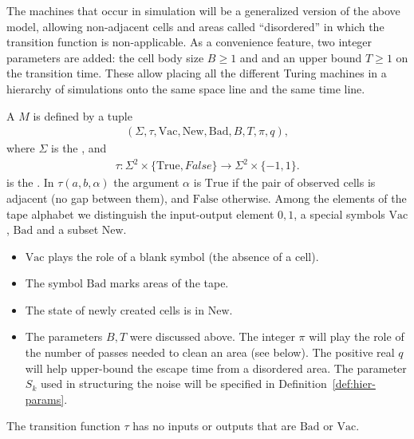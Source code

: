 \documentclass[11pt]{memoir}
\theoremstyle{definition} %
\renewcommand{\ge}{\geq}
\def\B{B}
\newcommand{\escno}{q}
\newcommand{\passno}{\pi}
\renewcommand{\S}{S} %
\newcommand{\Tu}{T}
\newcommand{\Bad}{\mathrm{Bad}}
\newcommand{\Vacant}{\mathrm{Vac}}
\newcommand{\New}{\mathrm{New}}
\newcommand{\True}{\mathrm{True}}
\newcommand{\False}{\mathrm{False}}
\begin{document}
The machines that occur in simulation will be a generalized version of the above model,
allowing non-adjacent cells and areas called ``disordered''
in which the transition function is non-applicable.
As a convenience feature, two integer parameters are added:
the cell body size \( \B\ge 1 \) and and an upper bound \( \Tu\ge 1 \) on the transition time.
These allow placing all the different Turing
machines in a hierarchy of simulations onto the same space line and the same time line.

\begin{definition}\label{def:gen-TM}
  A  \( M \) is defined by a tuple
  \begin{align}\label{eq:gen-TM}
    (\Sigma, \tau, \Vacant, \New, \Bad,\B, \Tu, \passno, \escno),
  \end{align}
  where \( \Sigma \) is the , and
\begin{align*}
  \tau: \Sigma^{2}\times\{\True,False\}\to \Sigma^{2}\times\{-1,1\}  .
\end{align*}
is the .
In  \( \tau(a,b,\alpha) \) the argument \( \alpha \) is \( \True \) if the pair of observed cells is
adjacent (no gap between them), and \( \False \) otherwise.
Among the elements of the tape alphabet we distinguish the input-output element \( 0,1 \),
a special symbols \( \Vacant \), \( \Bad \) and a subset \( \New \).
\begin{itemize}
\item \( \Vacant \) plays the role of a blank symbol (the absence of a cell).
 \item The symbol \( \Bad \) marks  areas of the tape.

   \item The state of newly created cells is in \( \New \).

    \item The parameters \( \B,\Tu \) were discussed above.
The integer \( \passno \) will play the role of the number of passes needed to clean an area (see below).
The positive real \( \escno \) will help upper-bound the escape time from a disordered area.
The parameter \( \S_{k} \) used in structuring the noise will be specified in
Definition~\ref{def:hier-params}.

\end{itemize}
The transition function \( \tau \) has no inputs or outputs that are \( \Bad \) or \( \Vacant \).

\end{definition}
\end{document}
